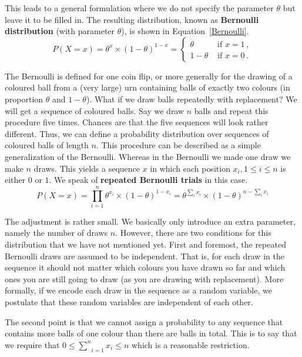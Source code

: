 This leads to a general formulation where we do not specify the parameter $ \theta $ but leave it to be filled in. 
The resulting distribution, known as \textbf{Bernoulli distribution} (with parameter $ \theta $), is shown in Equation~\eqref{Bernoulli}.
\begin{equation}\label{Bernoulli}
P(X=x) = \theta^{x} \times (1 - \theta)^{1-x} =
\begin{cases}
\theta & \mbox{ if $x=1$} \, , \\
1-\theta & \mbox{ if $x=0$} \, .
\end{cases}
\end{equation}

The Bernoulli is defined for one coin flip, or more generally for the
drawing of a coloured ball from a (very large) urn containing balls
of exactly two colours (in proportion $\theta$ and $1-\theta$). What if we draw balls repeatedly with replacement? We will get a sequence of coloured balls. 
Say we draw $ n $ balls and repeat this procedure five times. Chances are that the five sequences will look rather different.
Thus, we can define a probability distribution over sequences of
coloured balls of length $ n $. This procedure can be described as a simple generalization
of the Bernoulli. Whereas in the Bernoulli we made one draw we make $
n $ draws. This yields a sequence $ x $ in which each position $ x_{i}, 1 \leq i \leq n $ is either $ 0 $ or $ 1 $.
We speak of \textbf{repeated Bernoulli trials} in this case.
\begin{equation}\label{Multinoulli}
P(X=x) = \prod_{i=1}^{n} \theta^{x_{i}} \times (1 - \theta)^{1-x_{i}} = \theta^{\sum_i x_i} \times (1 - \theta)^{n-\sum_i x_i}
\end{equation}

The adjustment is rather small. We basically only introduce an extra parameter, namely the number of draws $ n $. 
However, there are two conditions for this distribution that we have not mentioned yet. First and foremost,
the repeated Bernoulli draws are assumed to be independent. That is, for each draw in the sequence it should not matter which colours you
have drawn so far and which ones you are still going to draw (as you
are drawing with replacement). More formally, if we encode each draw in the sequence as a random
variable, we postulate that these random variables are independent of each other. 

The second point is that we cannot assign a probability to any sequence that contains more balls of one colour than there are balls in total.
This is to say that we require that $ 0 \leq \underset{i=1}{\overset{n}{\sum}}x_{i} \leq n $ which is a reasonable restriction. 

